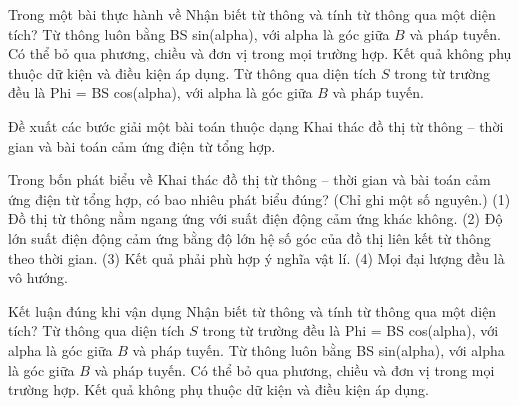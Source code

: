 \begin{ex}
Trong một bài thực hành về Nhận biết từ thông và tính từ thông qua một diện tích?
\choice
{Từ thông luôn bằng BS sin(alpha), với alpha là góc giữa $B$ và pháp tuyến.}
{Có thể bỏ qua phương, chiều và đơn vị trong mọi trường hợp.}
{Kết quả không phụ thuộc dữ kiện và điều kiện áp dụng.}
{\True Từ thông qua diện tích $S$ trong từ trường đều là Phi = BS cos(alpha), với alpha là góc giữa $B$ và pháp tuyến.}
\end{ex}

\begin{bt}
Đề xuất các bước giải một bài toán thuộc dạng Khai thác đồ thị từ thông – thời gian và bài toán cảm ứng điện từ tổng hợp.
\end{bt}

\begin{ex}
Trong bốn phát biểu về Khai thác đồ thị từ thông – thời gian và bài toán cảm ứng điện từ tổng hợp, có bao nhiêu phát biểu đúng? (Chỉ ghi một số nguyên.) (1) Đồ thị từ thông nằm ngang ứng với suất điện động cảm ứng khác không. (2) Độ lớn suất điện động cảm ứng bằng độ lớn hệ số góc của đồ thị liên kết từ thông theo thời gian. (3) Kết quả phải phù hợp ý nghĩa vật lí. (4) Mọi đại lượng đều là vô hướng.
\end{ex}

\begin{ex}
Kết luận đúng khi vận dụng Nhận biết từ thông và tính từ thông qua một diện tích?
\choice
{\True Từ thông qua diện tích $S$ trong từ trường đều là Phi = BS cos(alpha), với alpha là góc giữa $B$ và pháp tuyến.}
{Từ thông luôn bằng BS sin(alpha), với alpha là góc giữa $B$ và pháp tuyến.}
{Có thể bỏ qua phương, chiều và đơn vị trong mọi trường hợp.}
{Kết quả không phụ thuộc dữ kiện và điều kiện áp dụng.}
\end{ex}

